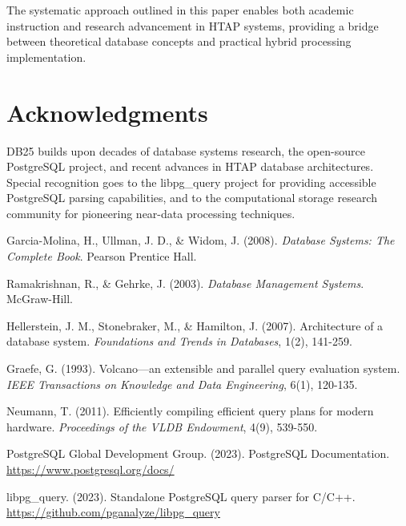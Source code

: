 \documentclass[12pt,a4paper]{article}
\begin{document}
    The systematic approach outlined in this paper enables both academic instruction and research advancement in HTAP systems, providing a bridge between theoretical database concepts and practical hybrid processing implementation.

    \section{Acknowledgments}

    DB25 builds upon decades of database systems research, the open-source PostgreSQL project, and recent advances in HTAP database architectures. Special recognition goes to the libpg\_query project for providing accessible PostgreSQL parsing capabilities, and to the computational storage research community for pioneering near-data processing techniques.

    
    \begin{thebibliography}{99}

        Garcia-Molina, H., Ullman, J. D., \& Widom, J. (2008).
        \textit{Database Systems: The Complete Book}.
        Pearson Prentice Hall.

        Ramakrishnan, R., \& Gehrke, J. (2003).
        \textit{Database Management Systems}.
        McGraw-Hill.

        Hellerstein, J. M., Stonebraker, M., \& Hamilton, J. (2007).
        Architecture of a database system.
        \textit{Foundations and Trends in Databases}, 1(2), 141-259.

        Graefe, G. (1993).
        Volcano—an extensible and parallel query evaluation system.
        \textit{IEEE Transactions on Knowledge and Data Engineering}, 6(1), 120-135.

        Neumann, T. (2011).
        Efficiently compiling efficient query plans for modern hardware.
        \textit{Proceedings of the VLDB Endowment}, 4(9), 539-550.

        PostgreSQL Global Development Group. (2023).
        PostgreSQL Documentation.
        \url{https://www.postgresql.org/docs/}

        libpg\_query. (2023).
        Standalone PostgreSQL query parser for C/C++.
        \url{https://github.com/pganalyze/libpg_query}

    \end{thebibliography}
\end{document}
